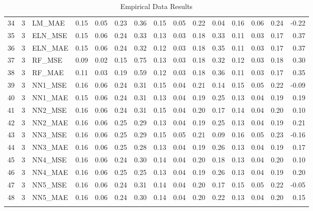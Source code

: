 \begin{longtable}{rrlrrrrrrrrrrrr}
  34 &   3 & LM\_MAE & 0.15 & 0.05 & 0.23 & 0.36 & 0.15 & 0.05 & 0.22 & 0.04 & 0.16 & 0.06 & 0.24 & -0.22 \\ 
  35 &   3 & ELN\_MSE & 0.15 & 0.06 & 0.24 & 0.33 & 0.13 & 0.03 & 0.18 & 0.33 & 0.11 & 0.03 & 0.17 & 0.37 \\ 
  36 &   3 & ELN\_MAE & 0.15 & 0.06 & 0.24 & 0.32 & 0.12 & 0.03 & 0.18 & 0.35 & 0.11 & 0.03 & 0.17 & 0.37 \\ 
  37 &   3 & RF\_MSE & 0.09 & 0.02 & 0.15 & 0.75 & 0.13 & 0.03 & 0.18 & 0.32 & 0.12 & 0.03 & 0.18 & 0.30 \\ 
  38 &   3 & RF\_MAE & 0.11 & 0.03 & 0.19 & 0.59 & 0.12 & 0.03 & 0.18 & 0.36 & 0.11 & 0.03 & 0.17 & 0.35 \\ 
  39 &   3 & NN1\_MSE & 0.16 & 0.06 & 0.24 & 0.31 & 0.15 & 0.04 & 0.21 & 0.14 & 0.15 & 0.05 & 0.22 & -0.09 \\ 
  40 &   3 & NN1\_MAE & 0.15 & 0.06 & 0.24 & 0.31 & 0.13 & 0.04 & 0.19 & 0.25 & 0.13 & 0.04 & 0.19 & 0.19 \\ 
  41 &   3 & NN2\_MSE & 0.16 & 0.06 & 0.24 & 0.31 & 0.15 & 0.04 & 0.20 & 0.17 & 0.14 & 0.04 & 0.20 & 0.10 \\ 
  42 &   3 & NN2\_MAE & 0.16 & 0.06 & 0.25 & 0.29 & 0.13 & 0.04 & 0.19 & 0.25 & 0.13 & 0.04 & 0.19 & 0.21 \\ 
  43 &   3 & NN3\_MSE & 0.16 & 0.06 & 0.25 & 0.29 & 0.15 & 0.05 & 0.21 & 0.09 & 0.16 & 0.05 & 0.23 & -0.16 \\ 
  44 &   3 & NN3\_MAE & 0.16 & 0.06 & 0.25 & 0.28 & 0.13 & 0.04 & 0.19 & 0.26 & 0.13 & 0.04 & 0.19 & 0.17 \\ 
  45 &   3 & NN4\_MSE & 0.16 & 0.06 & 0.24 & 0.30 & 0.14 & 0.04 & 0.20 & 0.18 & 0.13 & 0.04 & 0.20 & 0.10 \\ 
  46 &   3 & NN4\_MAE & 0.16 & 0.06 & 0.25 & 0.25 & 0.13 & 0.04 & 0.19 & 0.26 & 0.13 & 0.04 & 0.19 & 0.20 \\ 
  47 &   3 & NN5\_MSE & 0.16 & 0.06 & 0.24 & 0.31 & 0.14 & 0.04 & 0.20 & 0.17 & 0.15 & 0.05 & 0.22 & -0.05 \\ 
  48 &   3 & NN5\_MAE & 0.16 & 0.06 & 0.24 & 0.30 & 0.14 & 0.04 & 0.20 & 0.22 & 0.13 & 0.04 & 0.20 & 0.15 \\ 
   \hline
\hline
\caption{Empirical Data Results} 
\end{longtable}
